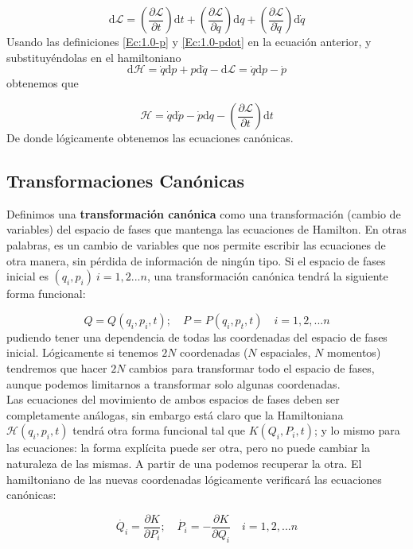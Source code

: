 \documentclass[12pt,a4paper]{article}
\numberwithin{equation}{section}
\numberwithin{figure}{section}
\newcommand{\parentesis}[1]{\left( #1  \right)}
\newcommand{\parciales}[2]{\frac{\partial #1}{\partial #2}}
\newcommand{\pparciales}[2]{\parentesis{\parciales{#1}{#2}}}
\newcommand{\D}{\mathrm{d}}
\newcommand{\Lcal}{\mathcal{L}}
\newcommand{\Hcal}{\mathcal{H}}
\begin{document}
\begin{equation}
\D \Lcal = \pparciales{\Lcal}{t} \D t +  \pparciales{\Lcal}{q} \D q +  \pparciales{\Lcal}{\dot{q}} \D \dot{q}
\end{equation}
Usando las definiciones \ref{Ec:1.0-p} y \ref{Ec:1.0-pdot} en la ecuación anterior, y substituyéndolas en el hamiltoniano
$$
\D \Hcal = \dot{q} \D p + p  \D \dot{q} - \D \Lcal = \dot{q} \D p - \dot{p} 
$$
obtenemos que

\begin{equation}
\Hcal = \dot{q} \D \dot p - \dot{p} \D q  - \pparciales{\Lcal}{t} \D t
\end{equation}
De donde lógicamente obtenemos las ecuaciones canónicas. 

\subsection{Transformaciones Canónicas}

Definimos una \textbf{transformación canónica} como una transformación (cambio de variables) del espacio de fases que mantenga las ecuaciones de Hamilton. En otras palabras, es un cambio de variables que nos permite escribir las ecuaciones de otra manera, sin pérdida de información de ningún tipo. Si el espacio de fases inicial es $(q_i,p_i) \ i = 1,2...n$, una transformación canónica tendrá la siguiente forma funcional:

\begin{equation}
Q = Q (q_i,p_i,t); \quad P = P (q_i,p_t,t) \quad i = 1,2,...n
\end{equation}
pudiendo tener una dependencia de todas las coordenadas del espacio de fases inicial. Lógicamente si tenemos $2N$ coordenadas ($N$ espaciales, $N$ momentos) tendremos que hacer $2N$ cambios para transformar todo el espacio de fases, aunque podemos limitarnos a transformar solo algunas coordenadas. \\

Las ecuaciones del movimiento de ambos espacios de fases deben ser completamente análogas, sin embargo está claro que la Hamiltoniana $\Hcal(q_i,p_i,t)$ tendrá otra forma funcional tal que $K(Q_i,P_i,t)$; y lo mismo para las ecuaciones: la forma explícita puede ser otra, pero no puede cambiar la naturaleza de las mismas. A partir de una podemos recuperar la otra. El hamiltoniano de las nuevas coordenadas lógicamente verificará las ecuaciones canónicas:
 
\begin{equation}
\dot{Q_i} = \parciales{K}{P_i}; \quad \dot{P_i} = - \parciales{K}{Q_i} \quad i =1,2,...n \label{Ec:1.1-Ecuaciones-canonicas-K}
\end{equation}
\end{document}
